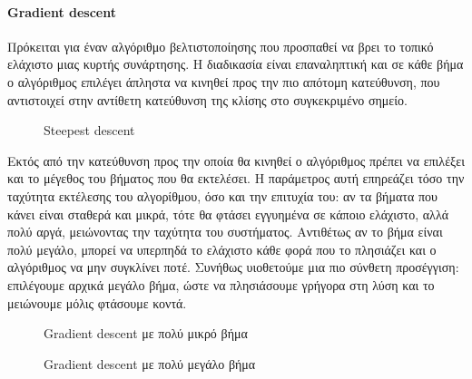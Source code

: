 \paragraph{Gradient descent} Πρόκειται για έναν αλγόριθμο βελτιστοποίησης που προσπαθεί να βρει το τοπικό ελάχιστο μιας κυρτής συνάρτησης. Η διαδικασία είναι επαναληπτική και σε κάθε βήμα ο αλγόριθμος επιλέγει άπληστα να κινηθεί προς την πιο απότομη κατεύθυνση, που αντιστοιχεί στην αντίθετη κατεύθυνση της κλίσης στο συγκεκριμένο σημείο.
\begin{figure}[H]
	\centering			
	\caption[Steepest descent]{Steepest descent}
\end{figure}
Εκτός από την κατεύθυνση προς την οποία θα κινηθεί ο αλγόριθμος πρέπει να επιλέξει και το μέγεθος του βήματος που θα εκτελέσει. Η παράμετρος αυτή επηρεάζει τόσο την ταχύτητα εκτέλεσης του αλγορίθμου, όσο και την επιτυχία του: αν τα βήματα που κάνει είναι σταθερά και μικρά, τότε θα φτάσει εγγυημένα σε κάποιο ελάχιστο, αλλά πολύ αργά, μειώνοντας την ταχύτητα του συστήματος. Αντιθέτως αν το βήμα είναι πολύ μεγάλο, μπορεί να υπερπηδά το ελάχιστο κάθε φορά που το πλησιάζει και ο αλγόριθμος να μην συγκλίνει ποτέ. Συνήθως υιοθετούμε μια πιο σύνθετη προσέγγιση: επιλέγουμε αρχικά μεγάλο βήμα, ώστε να πλησιάσουμε γρήγορα στη λύση και το μειώνουμε μόλις φτάσουμε κοντά.
\begin{figure}[H]
	\centering
	\begin{minipage}{.5\textwidth}
		\centering
		\caption[Gradient descent με πολύ μικρό βήμα]{Gradient descent με πολύ μικρό βήμα}
		
	\end{minipage}%
	\begin{minipage}{0.5\textwidth}
		\centering
		\caption[Gradient descent με πολύ μεγάλο βήμα]{Gradient descent με πολύ μεγάλο βήμα}
		
	\end{minipage}
\end{figure}